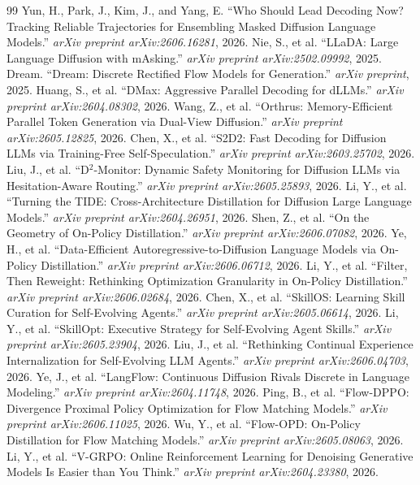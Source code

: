 \documentclass[11pt,a4paper]{article}
\begin{document}
\begin{thebibliography}{99}
 Yun, H., Park, J., Kim, J., and Yang, E. ``Who Should Lead Decoding Now? Tracking Reliable Trajectories for Ensembling Masked Diffusion Language Models.'' \emph{arXiv preprint arXiv:2606.16281}, 2026.
 Nie, S., et al. ``LLaDA: Large Language Diffusion with mAsking.'' \emph{arXiv preprint arXiv:2502.09992}, 2025.
 Dream. ``Dream: Discrete Rectified Flow Models for Generation.'' \emph{arXiv preprint}, 2025.
 Huang, S., et al. ``DMax: Aggressive Parallel Decoding for dLLMs.'' \emph{arXiv preprint arXiv:2604.08302}, 2026.
 Wang, Z., et al. ``Orthrus: Memory-Efficient Parallel Token Generation via Dual-View Diffusion.'' \emph{arXiv preprint arXiv:2605.12825}, 2026.
 Chen, X., et al. ``S2D2: Fast Decoding for Diffusion LLMs via Training-Free Self-Speculation.'' \emph{arXiv preprint arXiv:2603.25702}, 2026.
 Liu, J., et al. ``D$^2$-Monitor: Dynamic Safety Monitoring for Diffusion LLMs via Hesitation-Aware Routing.'' \emph{arXiv preprint arXiv:2605.25893}, 2026.
 Li, Y., et al. ``Turning the TIDE: Cross-Architecture Distillation for Diffusion Large Language Models.'' \emph{arXiv preprint arXiv:2604.26951}, 2026.
 Shen, Z., et al. ``On the Geometry of On-Policy Distillation.'' \emph{arXiv preprint arXiv:2606.07082}, 2026.
 Ye, H., et al. ``Data-Efficient Autoregressive-to-Diffusion Language Models via On-Policy Distillation.'' \emph{arXiv preprint arXiv:2606.06712}, 2026.
 Li, Y., et al. ``Filter, Then Reweight: Rethinking Optimization Granularity in On-Policy Distillation.'' \emph{arXiv preprint arXiv:2606.02684}, 2026.
 Chen, X., et al. ``SkillOS: Learning Skill Curation for Self-Evolving Agents.'' \emph{arXiv preprint arXiv:2605.06614}, 2026.
 Li, Y., et al. ``SkillOpt: Executive Strategy for Self-Evolving Agent Skills.'' \emph{arXiv preprint arXiv:2605.23904}, 2026.
 Liu, J., et al. ``Rethinking Continual Experience Internalization for Self-Evolving LLM Agents.'' \emph{arXiv preprint arXiv:2606.04703}, 2026.
 Ye, J., et al. ``LangFlow: Continuous Diffusion Rivals Discrete in Language Modeling.'' \emph{arXiv preprint arXiv:2604.11748}, 2026.
 Ping, B., et al. ``Flow-DPPO: Divergence Proximal Policy Optimization for Flow Matching Models.'' \emph{arXiv preprint arXiv:2606.11025}, 2026.
 Wu, Y., et al. ``Flow-OPD: On-Policy Distillation for Flow Matching Models.'' \emph{arXiv preprint arXiv:2605.08063}, 2026.
 Li, Y., et al. ``V-GRPO: Online Reinforcement Learning for Denoising Generative Models Is Easier than You Think.'' \emph{arXiv preprint arXiv:2604.23380}, 2026.
\end{thebibliography}
\end{document}
